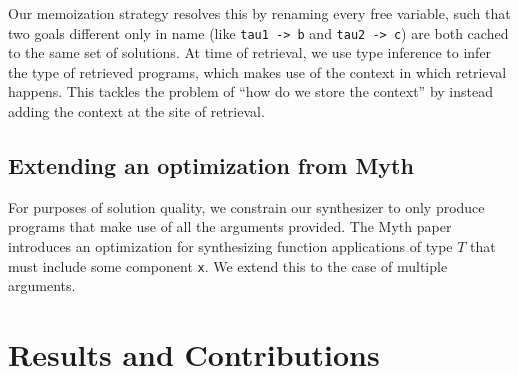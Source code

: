 \documentclass[acmsmall,nonacm]{acmart}
\begin{document}
Our memoization strategy resolves this by renaming every free variable,
such that two goals different only in name (like \texttt{tau1 -> b} 
and \texttt{tau2 -> c}) are both cached to the same set of solutions. 
At time of retrieval, we use type inference to infer the type of retrieved 
programs, which makes use of the context in which retrieval happens. 
This tackles the problem of ``how do we store the context'' by instead 
adding the context at the site of retrieval.

\subsection{Extending an optimization from Myth}

For purposes of solution quality, we constrain our synthesizer to only 
produce programs that make use of all the arguments provided. The Myth 
paper introduces an optimization for synthesizing function applications 
of type $T$ that must include some component \texttt{x}. We extend this 
to the case of multiple arguments.














\section{Results and Contributions}
\end{document}
